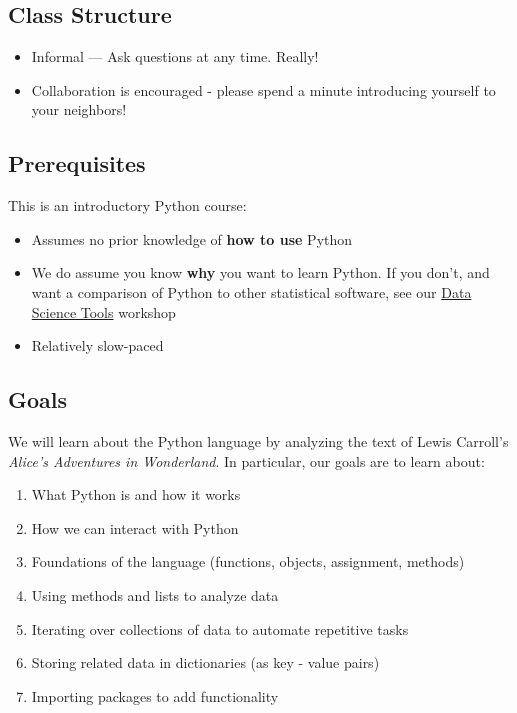 \documentclass[]{book}
\providecommand{\tightlist}{%
  \setlength{\itemsep}{0pt}\setlength{\parskip}{0pt}}
\begin{document}
\subsection{Class Structure}\label{class-structure-4}

\begin{itemize}
\tightlist
\item
  Informal --- Ask questions at any time. Really!
\item
  Collaboration is encouraged - please spend a minute introducing
  yourself to your neighbors!
\end{itemize}

\subsection{Prerequisites}\label{prerequisites-4}

This is an introductory Python course:

\begin{itemize}
\tightlist
\item
  Assumes no prior knowledge of \textbf{how to use} Python
\item
  We do assume you know \textbf{why} you want to learn Python. If you
  don't, and want a comparison of Python to other statistical software,
  see our \href{./DataScienceTools.html}{Data Science Tools} workshop
\item
  Relatively slow-paced
\end{itemize}

\subsection{Goals}\label{goals-2}

We will learn about the Python language by analyzing the text of Lewis
Carroll's \emph{Alice's Adventures in Wonderland}. In particular, our
goals are to learn about:

\begin{enumerate}
\def\labelenumi{\arabic{enumi}.}
\tightlist
\item
  What Python is and how it works
\item
  How we can interact with Python
\item
  Foundations of the language (functions, objects, assignment, methods)
\item
  Using methods and lists to analyze data
\item
  Iterating over collections of data to automate repetitive tasks
\item
  Storing related data in dictionaries (as key - value pairs)
\item
  Importing packages to add functionality
\end{enumerate}
\end{document}

